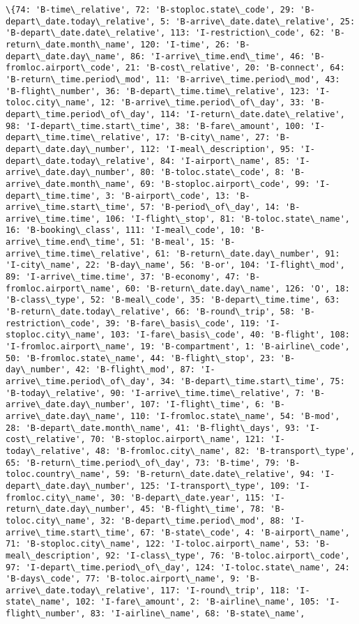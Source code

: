 \documentclass[11pt]{article}
\begin{document}
\begin{Verbatim}[commandchars=\\\{\}]
\{74: 'B-time\_relative', 72: 'B-stoploc.state\_code', 29: 'B-depart\_date.today\_relative', 5: 'B-arrive\_date.date\_relative', 25: 'B-depart\_date.date\_relative', 113: 'I-restriction\_code', 62: 'B-return\_date.month\_name', 120: 'I-time', 26: 'B-depart\_date.day\_name', 86: 'I-arrive\_time.end\_time', 46: 'B-fromloc.airport\_code', 21: 'B-cost\_relative', 20: 'B-connect', 64: 'B-return\_time.period\_mod', 11: 'B-arrive\_time.period\_mod', 43: 'B-flight\_number', 36: 'B-depart\_time.time\_relative', 123: 'I-toloc.city\_name', 12: 'B-arrive\_time.period\_of\_day', 33: 'B-depart\_time.period\_of\_day', 114: 'I-return\_date.date\_relative', 98: 'I-depart\_time.start\_time', 38: 'B-fare\_amount', 100: 'I-depart\_time.time\_relative', 17: 'B-city\_name', 27: 'B-depart\_date.day\_number', 112: 'I-meal\_description', 95: 'I-depart\_date.today\_relative', 84: 'I-airport\_name', 85: 'I-arrive\_date.day\_number', 80: 'B-toloc.state\_code', 8: 'B-arrive\_date.month\_name', 69: 'B-stoploc.airport\_code', 99: 'I-depart\_time.time', 3: 'B-airport\_code', 13: 'B-arrive\_time.start\_time', 57: 'B-period\_of\_day', 14: 'B-arrive\_time.time', 106: 'I-flight\_stop', 81: 'B-toloc.state\_name', 16: 'B-booking\_class', 111: 'I-meal\_code', 10: 'B-arrive\_time.end\_time', 51: 'B-meal', 15: 'B-arrive\_time.time\_relative', 61: 'B-return\_date.day\_number', 91: 'I-city\_name', 22: 'B-day\_name', 56: 'B-or', 104: 'I-flight\_mod', 89: 'I-arrive\_time.time', 37: 'B-economy', 47: 'B-fromloc.airport\_name', 60: 'B-return\_date.day\_name', 126: 'O', 18: 'B-class\_type', 52: 'B-meal\_code', 35: 'B-depart\_time.time', 63: 'B-return\_date.today\_relative', 66: 'B-round\_trip', 58: 'B-restriction\_code', 39: 'B-fare\_basis\_code', 119: 'I-stoploc.city\_name', 103: 'I-fare\_basis\_code', 40: 'B-flight', 108: 'I-fromloc.airport\_name', 19: 'B-compartment', 1: 'B-airline\_code', 50: 'B-fromloc.state\_name', 44: 'B-flight\_stop', 23: 'B-day\_number', 42: 'B-flight\_mod', 87: 'I-arrive\_time.period\_of\_day', 34: 'B-depart\_time.start\_time', 75: 'B-today\_relative', 90: 'I-arrive\_time.time\_relative', 7: 'B-arrive\_date.day\_number', 107: 'I-flight\_time', 6: 'B-arrive\_date.day\_name', 110: 'I-fromloc.state\_name', 54: 'B-mod', 28: 'B-depart\_date.month\_name', 41: 'B-flight\_days', 93: 'I-cost\_relative', 70: 'B-stoploc.airport\_name', 121: 'I-today\_relative', 48: 'B-fromloc.city\_name', 82: 'B-transport\_type', 65: 'B-return\_time.period\_of\_day', 73: 'B-time', 79: 'B-toloc.country\_name', 59: 'B-return\_date.date\_relative', 94: 'I-depart\_date.day\_number', 125: 'I-transport\_type', 109: 'I-fromloc.city\_name', 30: 'B-depart\_date.year', 115: 'I-return\_date.day\_number', 45: 'B-flight\_time', 78: 'B-toloc.city\_name', 32: 'B-depart\_time.period\_mod', 88: 'I-arrive\_time.start\_time', 67: 'B-state\_code', 4: 'B-airport\_name', 71: 'B-stoploc.city\_name', 122: 'I-toloc.airport\_name', 53: 'B-meal\_description', 92: 'I-class\_type', 76: 'B-toloc.airport\_code', 97: 'I-depart\_time.period\_of\_day', 124: 'I-toloc.state\_name', 24: 'B-days\_code', 77: 'B-toloc.airport\_name', 9: 'B-arrive\_date.today\_relative', 117: 'I-round\_trip', 118: 'I-state\_name', 102: 'I-fare\_amount', 2: 'B-airline\_name', 105: 'I-flight\_number', 83: 'I-airline\_name', 68: 'B-state\_name', 
\end{Verbatim}
\end{document}

